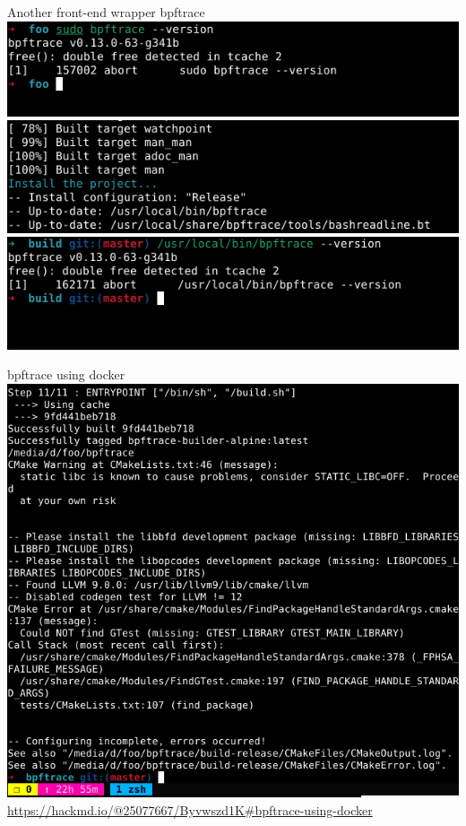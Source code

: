 \documentclass{beamer}
\begin{document}
\begin{CJK*}{UTF8}{bsmi}
  \begin{frame}{Another front-end wrapper bpftrace}
    \includegraphics[width=\textwidth]{eU4xGbt.png}\\
    \includegraphics[width=\textwidth]{SHtVxmB.png}\\
    \includegraphics[width=\textwidth]{W4JhZcO.png}
  \end{frame}

  \begin{frame}{bpftrace using docker}
    \includegraphics[height=.8\textheight]{f6GBfST.png}
    \url{https://hackmd.io/@25077667/Byvwszd1K\#bpftrace-using-docker}
  \end{frame}


\end{CJK*}
\end{document}
